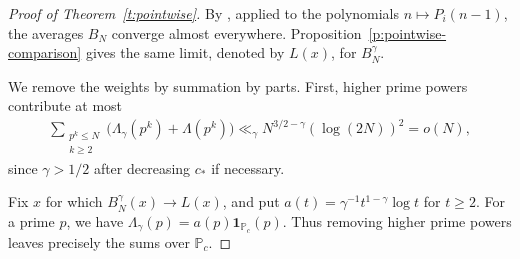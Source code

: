 \documentclass[12pt]{amsart}
\newcommand{\1}{\mathbf 1}
\begin{document}
\begin{proof}[Proof of Theorem~\ref{t:pointwise}]
By \cite[Theorem~1.1(ii)]{MirekWanWright}, applied to the
polynomials $n\mapsto P_i(n-1)$, the averages $B_N$ converge
almost everywhere. Proposition~\ref{p:pointwise-comparison}
gives the same limit, denoted by $L(x)$, for $B_N^\gamma$.

We remove the weights by summation by parts. First, higher
prime powers contribute at most
\begin{align}\label{e:primepowers}
    \sum_{\substack{p^k\leq N\\k\geq2}}
 \bigl(\Lambda_\gamma(p^k)+\Lambda(p^k)\bigr)
 \ll_\gamma N^{3/2-\gamma}(\log(2N))^2=o(N),
\end{align}
since $\gamma>1/2$ after decreasing $c_*$ if necessary.

Fix $x$ for which $B_N^\gamma(x)\to L(x)$, and put
$a(t)=\gamma^{-1}t^{1-\gamma}\log t$ for $t\geq2$. For a prime $p$,
we have $\Lambda_\gamma(p)=a(p)\1_{\mathbb P_c}(p)$. Thus removing
higher prime powers leaves precisely the sums over $\mathbb P_c$.


\end{proof}
\end{document}
